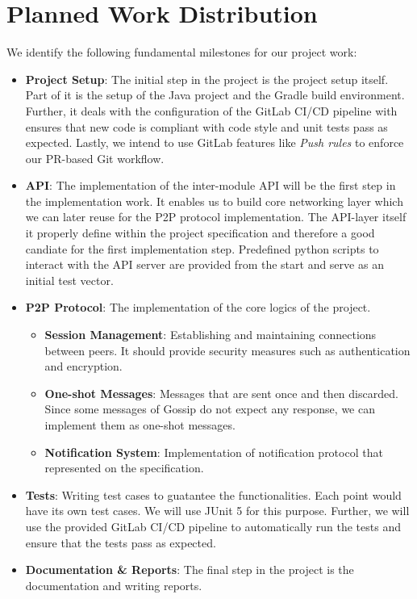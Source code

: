 \documentclass[a4paper, 11pt]{article}
\begin{document}
    \section{Planned Work Distribution}\label{sec:planned-work-distribution}

    We identify the following fundamental milestones for our project work:

    \begin{itemize}
        \setlength\itemsep{0em}
        \item \textbf{Project Setup}: The initial step in the project is the project setup itself.
        Part of it is the setup of the Java project and the Gradle build environment.
        Further, it deals with the configuration of the GitLab CI/CD pipeline with ensures that new code is
        compliant with code style and unit tests pass as expected.
        Lastly, we intend to use GitLab features like \textit{Push rules} to enforce our PR-based Git workflow.
        \item \textbf{API}: The implementation of the inter-module API will be the first step in the implementation work.
        It enables us to build core networking layer which we can later reuse for the P2P protocol implementation.
        The API-layer itself it properly define within the project specification and therefore a good candiate for the first implementation step.
        Predefined python scripts to interact with the API server are provided from the start and serve as an initial test vector.
        \item \textbf{P2P Protocol}: The implementation of the core logics of the project.
        \begin{itemize}
            \setlength\itemsep{0em}
            \item \textbf{Session Management}: Establishing and maintaining connections between peers.
            It should provide security measures such as authentication and encryption.
            \item \textbf{One-shot Messages}: Messages that are sent once and then discarded.
            Since some messages of Gossip do not expect any response, we can implement them as one-shot messages.
            \item \textbf{Notification System}: Implementation of notification protocol that represented on the specification.
        \end{itemize}
        \item \textbf{Tests}: Writing test cases to guatantee the functionalities.
        Each point would have its own test cases. We will use JUnit 5 for this purpose.
        Further, we will use the provided GitLab CI/CD pipeline to automatically run the tests and ensure that the tests pass as expected.
        \item \textbf{Documentation \& Reports}: The final step in the project is the documentation and writing reports.
    \end{itemize}
\end{document}
